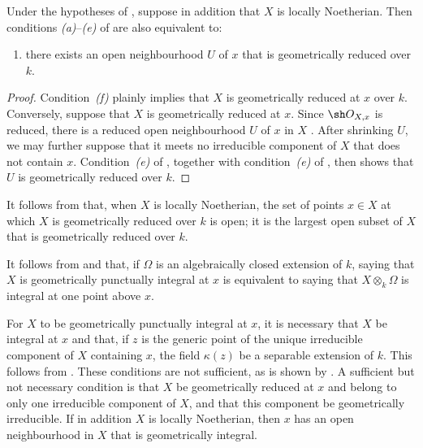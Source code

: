 \begin{corollary}[4.6.13]
\label{IV.4.6.13}
Under the hypotheses of , suppose in addition that
$X$ is locally Noetherian.
Then conditions \emph{(a)}--\emph{(e)} of  are also
equivalent to:
\begin{enumerate}
\item[\rm(f)]
\label{IV.4.6.13.f}
there exists an open neighbourhood $U$ of $x$ that is geometrically
reduced over $k$.
\end{enumerate}
\end{corollary}

\begin{proof}
Condition~\emph{(f)} plainly implies that $X$ is geometrically reduced
at $x$ over $k$.
Conversely, suppose that $X$ is geometrically reduced at $x$.
Since $\sh O_{X,x}$ is reduced, there is a reduced open neighbourhood
$U$ of $x$ in $X$ .
After shrinking $U$, we may further suppose that it meets no
irreducible component of $X$ that does not contain $x$.
Condition~\emph{(e)} of , together with
condition~\emph{(e)} of , then shows that $U$ is
geometrically reduced over $k$.
\end{proof}

It follows from  that, when $X$ is locally Noetherian,
the set of points $x\in X$ at which $X$ is geometrically reduced over
$k$ is open; it is the largest open subset of $X$ that is
geometrically reduced over $k$.

\begin{env}[4.6.14]
\label{IV.4.6.14}
It follows from  and  that, if
$\Omega$ is an algebraically closed extension of $k$, saying that $X$
is geometrically punctually integral at $x$ is equivalent to saying
that $X\otimes_k\Omega$ is integral at one point above $x$.

For $X$ to be geometrically punctually integral at $x$, it is
necessary that $X$ be integral at $x$ and that, if $z$ is the generic
point of the unique irreducible component of $X$ containing $x$, the
field $\kappa(z)$ be a separable extension of $k$.
This follows from .
These conditions are not sufficient, as is shown by
.
A sufficient but not necessary condition is that $X$ be geometrically
reduced at $x$ and belong to only one irreducible component of $X$,
and that this component be geometrically irreducible.
If in addition $X$ is locally Noetherian, then $x$ has an open
neighbourhood in $X$ that is geometrically integral.
\end{env}

